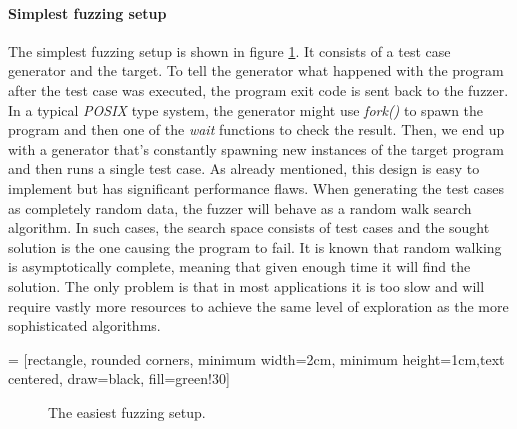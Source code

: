 \paragraph{Simplest fuzzing setup}
The simplest fuzzing setup is shown in figure \ref{fig:simp_fuzz}. It consists of a test case generator and the target. To tell the generator what happened with the program after the test case was executed, the program exit code is sent back to the fuzzer. In a typical \textit{POSIX} type system, the generator might use \textit{fork()} to spawn the program and then one of the \textit{wait} functions to check the result. Then, we end up with a generator that's constantly spawning new instances of the target program and then runs a single test case. As already mentioned, this design is easy to implement but has significant performance flaws. When generating the test cases as completely random data, the fuzzer will behave as a random walk search algorithm. In such cases, the search space consists of test cases and the sought solution is the one causing the program to fail. It is known that random walking is asymptotically complete, meaning that given enough time it will find the solution. The only problem is that in most applications it is too slow and will require vastly more resources to achieve the same level of exploration as the more sophisticated algorithms.

 = [rectangle, rounded corners, minimum width=2cm, minimum height=1cm,text centered, draw=black, fill=green!30]

\begin{figure}[h!]
    \centering


    \caption{The easiest fuzzing setup.}
    \label{fig:simp_fuzz}
\end{figure}

